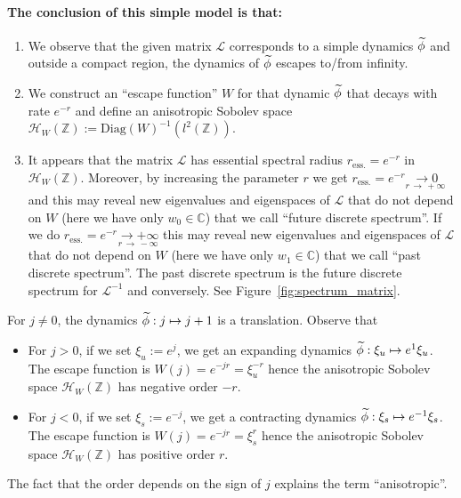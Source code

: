 \documentclass[AHL,Unicode,longabstracts,published]{cedram}
\newcommand{\clH}{\mathcal{H}}
\newcommand{\clL}{\mathcal{L}}
\newcommand{\Diag}{\mathrm{Diag}}
\newcommand{\esss}{\mathrm{ess.}}
\newcommand{\bbC}{\mathbb{C}}
\newcommand{\bbZ}{\mathbb{Z}}
\let\oldtilde\tilde
\renewcommand*{\tilde}[1]{\mathchoice{\widetilde{#1}}{\widetilde{#1}}{\oldtilde{#1}}{\oldtilde{#1}}}
\newcommand{\clH}{\mathcal{H}}
\begin{document}
\paragraph{The conclusion of this simple model is that:}
\begin{enumerate}
\item We observe that the given matrix $\clL$ corresponds to a simple dynamics $\tilde{\phi}$ and outside a compact region, the dynamics of $\tilde{\phi}$ escapes to/from infinity.
\item We construct an ``escape function'' $W$ for that dynamic $\tilde{\phi}$ that decays with rate $e^{-r}$ and define an anisotropic Sobolev space $\clH _{W}(\bbZ):=\Diag(W)^{-1}(l^{2}(\bbZ))$.
\item It appears that the matrix $\clL$ has essential spectral radius $r_{\esss}=e^{-r}$ in $\clH _{W}(\bbZ)$. Moreover, by increasing the parameter $r$ we get $r_{\esss}=e^{-r}\underset{r\,\rightarrow\,+\infty}{\rightarrow0}$ and this may reveal new eigenvalues and eigenspaces of $\clL$ that do not depend on $W$ (here we have only $w_{0}\in\bbC$) that we call ``future discrete spectrum''. If we do $r_{\esss}=e^{-r}\underset{r\,\rightarrow\,-\infty}{\rightarrow+\infty}$ this may reveal new eigenvalues and eigenspaces of $\clL$ that do not depend on $W$ (here we have only $w_{1}\in\bbC$) that we call ``past discrete spectrum''. The past discrete spectrum is the future discrete spectrum for $\clL^{-1}$ and conversely. See Figure~\ref{fig:spectrum_matrix}.
\end{enumerate}
\begin{rema}
For $j\neq0$, the dynamics $\tilde{\phi}:j\mapsto j+1$ is a translation. Observe that
\begin{itemize}
\item For $j>0$, if we set $\xi_{u}:=e^{j}$, we get an expanding dynamics $\tilde{\phi}:\xi_{u}\mapsto e^{1}\xi_{u}$. The escape function is $W(j)=e^{-jr}=\xi_{u}^{-r}$ hence the anisotropic Sobolev space $\clH _{W}(\bbZ)$ has negative order $-r$.
\item For $j<0$, if we set $\xi_{s}:=e^{-j}$, we get a contracting dynamics $\tilde{\phi}:\xi_{s}\mapsto e^{-1}\xi_{s}$. The escape function is $W(j)=e^{-jr}=\xi_{s}^{r}$ hence the anisotropic Sobolev space $\clH _{W}(\bbZ)$ has positive order $r$.
\end{itemize}
The fact that the order depends on the sign of $j$ explains the term ``anisotropic''.
\end{rema}
\end{document}
